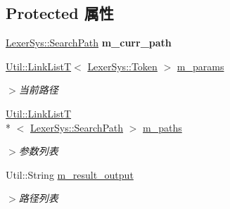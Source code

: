 \subsection*{Protected 属性}
\begin{DoxyCompactItemize}
\item 
\hypertarget{class_command_sys_1_1_console_command_a662c78fdb599ea9c15365fa716fe9106}{\hyperlink{class_lexer_sys_1_1_search_path}{Lexer\-Sys\-::\-Search\-Path} {\bfseries m\-\_\-curr\-\_\-path}}\label{class_command_sys_1_1_console_command_a662c78fdb599ea9c15365fa716fe9106}

\item 
\hypertarget{class_command_sys_1_1_console_command_a04f042e84f0979df89dfa4467dab9139}{\hyperlink{class_util_1_1_link_list_t}{Util\-::\-Link\-List\-T}$<$ \hyperlink{class_lexer_sys_1_1_token}{Lexer\-Sys\-::\-Token} $>$ \hyperlink{class_command_sys_1_1_console_command_a04f042e84f0979df89dfa4467dab9139}{m\-\_\-params}}\label{class_command_sys_1_1_console_command_a04f042e84f0979df89dfa4467dab9139}

\begin{DoxyCompactList}\small\item\em $>$当前路径 \end{DoxyCompactList}\item 
\hypertarget{class_command_sys_1_1_console_command_a947a59518b6441cb88f679deb13a5207}{\hyperlink{class_util_1_1_link_list_t}{Util\-::\-Link\-List\-T}\\*
$<$ \hyperlink{class_lexer_sys_1_1_search_path}{Lexer\-Sys\-::\-Search\-Path} $>$ \hyperlink{class_command_sys_1_1_console_command_a947a59518b6441cb88f679deb13a5207}{m\-\_\-paths}}\label{class_command_sys_1_1_console_command_a947a59518b6441cb88f679deb13a5207}

\begin{DoxyCompactList}\small\item\em $>$参数列表 \end{DoxyCompactList}\item 
\hypertarget{class_command_sys_1_1_console_command_af386498b8ae657e258f7c8a9c0569c98}{Util\-::\-String \hyperlink{class_command_sys_1_1_console_command_af386498b8ae657e258f7c8a9c0569c98}{m\-\_\-result\-\_\-output}}\label{class_command_sys_1_1_console_command_af386498b8ae657e258f7c8a9c0569c98}

\begin{DoxyCompactList}\small\item\em $>$路径列表 \end{DoxyCompactList}\end{DoxyCompactItemize}


